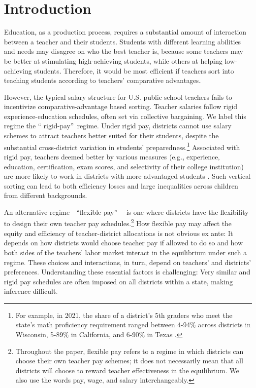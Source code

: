 \documentclass[notitlepage,12pt]{article}%
\begin{document}
\setcounter{page}{1}%


\section{Introduction}

Education, as a production process, requires a substantial amount of
interaction between a teacher and their students. Students with different
learning abilities and needs may disagree on who the best teacher is, because
some teachers may be better at stimulating high-achieving students, while
others at helping low-achieving students. Therefore, it would be most
efficient if teachers sort into teaching students according to teachers'
comparative advantages.

However, the typical salary structure for U.S. public school teachers
fails to incentivize comparative-advantage based sorting. Teacher salaries
follow rigid experience-education schedules, often set via collective
bargaining. We label this regime the \textquotedblleft
rigid-pay\textquotedblright\ regime. Under rigid pay, districts cannot use
salary schemes to attract teachers better suited for their students, despite
the substantial cross-district variation in students'
preparedness.\footnote{For example, in 2021, the share of a district's 5th
graders who meet the state's math proficiency requirement ranged between
4-94\% across districts in Wisconsin, 5-89\% in California, and 6-90\% in
Texas \citep{eddataexpress}.} Associated with rigid pay, teachers deemed better by various measures (e.g., experience, education, certification, exam scores, and selectivity of their college institution) are more likely to work in districts with more advantaged students \citep{lankford2002teacher,ingersoll2004high,clotfelter2005teaches,mansfield2015teacher,jacob2007challenges}. Such vertical sorting can lead to both efficiency losses and large
inequalities across children from different backgrounds.


An alternative regime---\textquotedblleft flexible pay\textquotedblright--- is
one where districts have the flexibility to design their own teacher pay
schedules.\footnote{Throughout the paper, flexible pay refers to a regime in
which districts can choose their own teacher pay schemes; it does not
necessarily mean that all districts will choose to reward teacher
effectiveness in the equilibrium. We also use the words pay, wage, and salary
interchangeably.} How flexible pay may affect the equity and efficiency of
teacher-district allocations is not obvious ex ante: It depends on how
districts would choose teacher pay if allowed to do so and how both sides of
the teachers' labor market interact in the equilibrium under such a regime.
These choices and interactions, in turn, depend on teachers' and districts'
preferences. Understanding these essential factors is challenging: Very
similar and rigid pay schedules are often imposed on all districts within a
state, making inference difficult.
\end{document}
